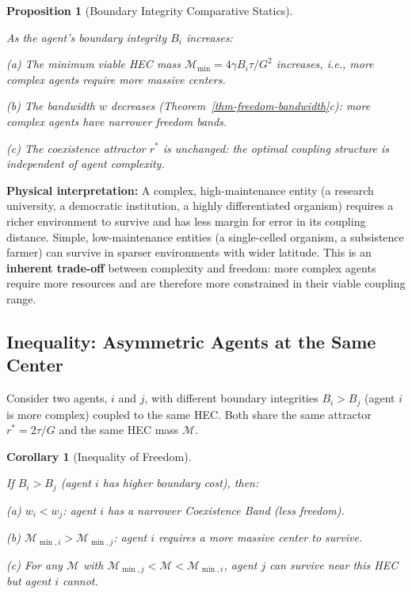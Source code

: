 \documentclass[11pt]{article}
\theoremstyle{plain}
\newtheorem{proposition}[theorem]{Proposition}
\newtheorem{corollary}[theorem]{Corollary}
\theoremstyle{definition}
\theoremstyle{remark}
\let\origsubsection\subsection
\renewcommand{\subsection}{\needspace{7\baselineskip}\origsubsection}
\begin{document}
\begin{proposition}[Boundary Integrity Comparative Statics]
\label{prop-boundary-integrity-comparative-statics}

As the agent's boundary integrity $B_i$ increases:

(a) The minimum viable HEC mass $\mathcal{M}_{\min} = 4\gamma B_i \tau / G^2$ increases, i.e., more complex agents require more massive centers.

(b) The bandwidth $w$ decreases (Theorem~\ref{thm-freedom-bandwidth}c): more complex agents have narrower freedom bands.

(c) The coexistence attractor $r^*$ is unchanged: the optimal coupling structure is independent of agent complexity.
\end{proposition}

\textbf{Physical interpretation:} A complex, high-maintenance entity (a
research university, a democratic institution, a highly differentiated
organism) requires a richer environment to survive and has less margin
for error in its coupling distance. Simple, low-maintenance entities (a
single-celled organism, a subsistence farmer) can survive in sparser
environments with wider latitude. This is an \textbf{inherent trade-off}
between complexity and freedom: more complex agents require more
resources and are therefore more constrained in their viable coupling
range.

\subsection{Inequality: Asymmetric Agents at the Same
Center}\label{inequality-asymmetric-agents-at-the-same-center}

Consider two agents, \(i\) and \(j\), with different boundary
integrities \(B_i > B_j\) (agent \(i\) is more complex) coupled to the
same HEC. Both share the same attractor \(r^* = 2\tau/G\) and the same
HEC mass \(\mathcal{M}\).

\begin{corollary}[Inequality of Freedom]
\label{cor-inequality-of-freedom}

If $B_i > B_j$ (agent $i$ has higher boundary cost), then:

(a) $w_i < w_j$: agent $i$ has a narrower Coexistence Band (less freedom).

(b) $\mathcal{M}_{\min,i} > \mathcal{M}_{\min,j}$: agent $i$ requires a more massive center to survive.

(c) For any $\mathcal{M}$ with $\mathcal{M}_{\min,j} < \mathcal{M} < \mathcal{M}_{\min,i}$, agent $j$ can survive near this HEC but agent $i$ cannot.
\end{corollary}
\end{document}
